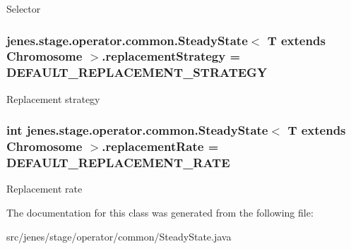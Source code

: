 Selector \hypertarget{classjenes_1_1stage_1_1operator_1_1common_1_1_steady_state_3_01_t_01extends_01_chromosome_01_4_4d727adbb35eaad5d78fc59abaabea0c}{
\subsubsection[replacementStrategy]{ jenes.stage.operator.common.SteadyState$<$ T extends Chromosome $>$.{\bf replacementStrategy} = {\bf DEFAULT\_\-REPLACEMENT\_\-STRATEGY}}}
\label{classjenes_1_1stage_1_1operator_1_1common_1_1_steady_state_3_01_t_01extends_01_chromosome_01_4_4d727adbb35eaad5d78fc59abaabea0c}


Replacement strategy \hypertarget{classjenes_1_1stage_1_1operator_1_1common_1_1_steady_state_3_01_t_01extends_01_chromosome_01_4_84dd70ced0dad9433e4168f18eb735f9}{
\subsubsection[replacementRate]{\setlength{\rightskip}{0pt plus 5cm}int jenes.stage.operator.common.SteadyState$<$ T extends Chromosome $>$.{\bf replacementRate} = {\bf DEFAULT\_\-REPLACEMENT\_\-RATE}}}
\label{classjenes_1_1stage_1_1operator_1_1common_1_1_steady_state_3_01_t_01extends_01_chromosome_01_4_84dd70ced0dad9433e4168f18eb735f9}


Replacement rate 

The documentation for this class was generated from the following file:\begin{CompactItemize}
\item 
src/jenes/stage/operator/common/SteadyState.java\end{CompactItemize}
